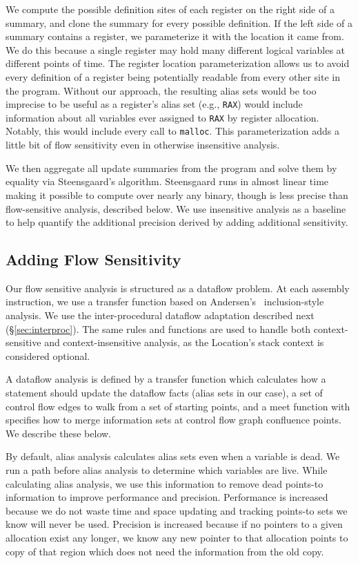 We compute the possible definition sites of each register on the right side of a summary, and clone the summary for every possible definition.
If the left side of a summary contains a register, we parameterize it with the location it came from.
We do this because a single register may hold many different logical variables at different points of time.
The register location parameterization allows us to avoid every definition of a register being potentially readable from every other site in the program.
Without our approach, the resulting alias sets would be too imprecise to be useful as a register's alias set (e.g., \texttt{RAX}) would include information about all variables ever assigned to \texttt{RAX} by register allocation.
Notably, this would include every call to \texttt{malloc}.
This parameterization adds a little bit of flow sensitivity even in otherwise insensitive analysis.

We then aggregate all update summaries from the program and solve them by equality via Steensgaard's algorithm.
Steensgaard runs  in almost linear time~\cite{steensgaard-alias} making it possible to compute over nearly any binary, though is less precise than flow-sensitive analysis, described below.
We use insensitive analysis as a baseline to help quantify the additional precision derived by adding additional sensitivity.




\subsection{Adding Flow Sensitivity}
Our flow sensitive analysis is structured as a dataflow problem.  At each assembly instruction, we use a transfer
function based on Andersen's~\cite{andersen} inclusion-style analysis.
We use the inter-procedural dataflow adaptation described next (\S\ref{sec:interproc}).
The same rules and functions are used to handle both context-sensitive
and context-insensitive analysis, as the Location's stack context is
considered optional.

A dataflow analysis is defined by a transfer function which calculates how a statement should update the dataflow facts
(alias sets in our case),
a set of control flow edges to walk from a set of starting points,
and a meet function with specifies how to merge information sets at control flow graph confluence points.
We describe these below.

By default, alias analysis calculates alias sets even when a variable is dead.
We run a path before alias analysis to determine which variables are live.
While calculating alias analysis, we use this information to remove dead points-to information to improve performance and precision.
Performance is increased because we do not waste time and space updating and tracking points-to
sets we know will never be used.
Precision is increased because if no pointers to a given allocation exist any longer, we know any new pointer to that allocation points to copy of that region which does not need the information from the old copy.

